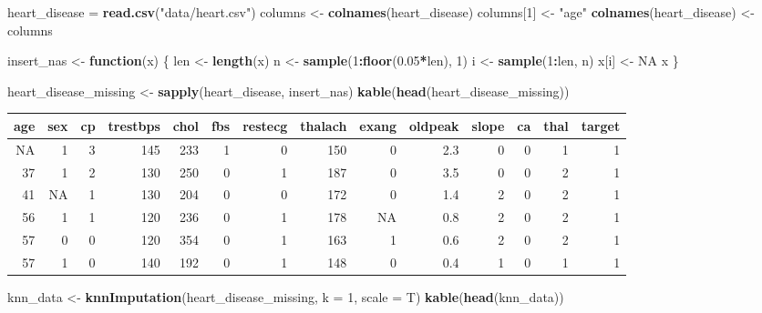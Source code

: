 \documentclass[]{article}
\newenvironment{Shaded}{\begin{snugshade}}{\end{snugshade}}
\newcommand{\KeywordTok}[1]{\textcolor[rgb]{0.13,0.29,0.53}{\textbf{#1}}}
\newcommand{\DataTypeTok}[1]{\textcolor[rgb]{0.13,0.29,0.53}{#1}}
\newcommand{\DecValTok}[1]{\textcolor[rgb]{0.00,0.00,0.81}{#1}}
\newcommand{\FloatTok}[1]{\textcolor[rgb]{0.00,0.00,0.81}{#1}}
\newcommand{\StringTok}[1]{\textcolor[rgb]{0.31,0.60,0.02}{#1}}
\newcommand{\OtherTok}[1]{\textcolor[rgb]{0.56,0.35,0.01}{#1}}
\newcommand{\ControlFlowTok}[1]{\textcolor[rgb]{0.13,0.29,0.53}{\textbf{#1}}}
\newcommand{\OperatorTok}[1]{\textcolor[rgb]{0.81,0.36,0.00}{\textbf{#1}}}
\newcommand{\NormalTok}[1]{#1}
\begin{document}
\begin{Shaded}
\begin{Highlighting}[]
\NormalTok{heart_disease =}\StringTok{ }\KeywordTok{read.csv}\NormalTok{(}\StringTok{"data/heart.csv"}\NormalTok{)}
\NormalTok{columns <-}\StringTok{ }\KeywordTok{colnames}\NormalTok{(heart_disease)}
\NormalTok{columns[}\DecValTok{1}\NormalTok{] <-}\StringTok{ "age"}
\KeywordTok{colnames}\NormalTok{(heart_disease) <-}\StringTok{ }\NormalTok{columns}

\NormalTok{insert_nas <-}\StringTok{ }\ControlFlowTok{function}\NormalTok{(x) \{}
\NormalTok{  len <-}\StringTok{ }\KeywordTok{length}\NormalTok{(x)}
\NormalTok{  n <-}\StringTok{ }\KeywordTok{sample}\NormalTok{(}\DecValTok{1}\OperatorTok{:}\KeywordTok{floor}\NormalTok{(}\FloatTok{0.05}\OperatorTok{*}\NormalTok{len), }\DecValTok{1}\NormalTok{)}
\NormalTok{  i <-}\StringTok{ }\KeywordTok{sample}\NormalTok{(}\DecValTok{1}\OperatorTok{:}\NormalTok{len, n)}
\NormalTok{  x[i] <-}\StringTok{ }\OtherTok{NA} 
\NormalTok{  x}
\NormalTok{\}}

\NormalTok{heart_disease_missing <-}\StringTok{ }\KeywordTok{sapply}\NormalTok{(heart_disease, insert_nas)}
\KeywordTok{kable}\NormalTok{(}\KeywordTok{head}\NormalTok{(heart_disease_missing))}
\end{Highlighting}
\end{Shaded}

\begin{longtable}[]{@{}rrrrrrrrrrrrrr@{}}
\toprule
age & sex & cp & trestbps & chol & fbs & restecg & thalach & exang &
oldpeak & slope & ca & thal & target\tabularnewline
\midrule
\endhead
NA & 1 & 3 & 145 & 233 & 1 & 0 & 150 & 0 & 2.3 & 0 & 0 & 1 &
1\tabularnewline
37 & 1 & 2 & 130 & 250 & 0 & 1 & 187 & 0 & 3.5 & 0 & 0 & 2 &
1\tabularnewline
41 & NA & 1 & 130 & 204 & 0 & 0 & 172 & 0 & 1.4 & 2 & 0 & 2 &
1\tabularnewline
56 & 1 & 1 & 120 & 236 & 0 & 1 & 178 & NA & 0.8 & 2 & 0 & 2 &
1\tabularnewline
57 & 0 & 0 & 120 & 354 & 0 & 1 & 163 & 1 & 0.6 & 2 & 0 & 2 &
1\tabularnewline
57 & 1 & 0 & 140 & 192 & 0 & 1 & 148 & 0 & 0.4 & 1 & 0 & 1 &
1\tabularnewline
\bottomrule
\end{longtable}

\begin{Shaded}
\begin{Highlighting}[]
\NormalTok{knn_data <-}\StringTok{ }\KeywordTok{knnImputation}\NormalTok{(heart_disease_missing, }\DataTypeTok{k =} \DecValTok{1}\NormalTok{, }\DataTypeTok{scale =}\NormalTok{ T)}
\KeywordTok{kable}\NormalTok{(}\KeywordTok{head}\NormalTok{(knn_data))}
\end{Highlighting}
\end{Shaded}
\end{document}
